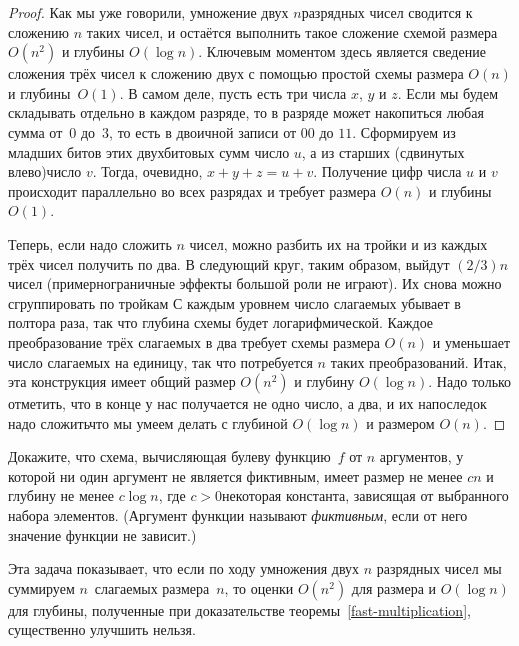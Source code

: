\begin{proof}
Как мы уже говорили, умножение двух $n$\д разрядных чисел
сводится к сложению $n$ таких чисел, и остаётся выполнить такое
сложение схемой размера $O(n^2)$ и глубины $O(\log n)$. Ключевым
моментом здесь является сведение сложения трёх чисел к сложению
двух с помощью простой схемы размера $O(n)$ и глубины~$O(1)$. В
самом деле, пусть есть три числа $x$, $y$ и $z$. Если мы будем
складывать отдельно в каждом разряде, то в разряде может
накопиться любая сумма от~$0$ до~$3$, то есть в двоичной записи
от $00$ до $11$. Сформируем из младших битов этих двухбитовых
сумм число $u$, а из старших (сдвинутых влево)\т число
$v$. Тогда, очевидно, $x+y+z=u+v$. Получение цифр числа $u$ и
$v$ происходит параллельно во всех разрядах и требует размера
$O(n)$ и глубины~$O(1)$.

Теперь, если надо сложить $n$ чисел, можно разбить их на тройки
и из каждых трёх чисел получить по два. В следующий круг, таким
образом, выйдут $(2/3)n$ чисел (примерно\т граничные эффекты
большой роли не играют). Их снова можно сгруппировать по тройкам
 С каждым уровнем число слагаемых убывает в полтора раза,
так что глубина схемы будет логарифмической. Каждое
преобразование трёх слагаемых в два требует схемы размера $O(n)$
и уменьшает число слагаемых на единицу, так что потребуется $n$
таких преобразований. Итак, эта конструкция имеет общий размер
$O(n^2)$ и глубину $O(\log n)$. Надо только отметить, что в
конце у нас получается не одно число, а два, и их напоследок
надо сложить\т что мы умеем делать с глубиной $O(\log n)$ и
размером $O(n)$.
\end{proof}

\begin{problem}
Докажите, что схема, вычисляющая булеву функцию~$f$ от $n$
аргументов, у которой ни один аргумент не является фиктивным,
имеет размер не менее $cn$ и глубину не менее $c\log n$, где
$c>0$\т некоторая константа, зависящая от выбранного набора
элементов. (Аргумент функции называют \emph{фиктивным},%
%
если от
него значение функции не зависит.)
\end{problem}

Эта задача показывает, что если по ходу умножения двух $n$\д
разрядных чисел мы суммируем $n$~слагаемых размера~$n$, то
оценки $O(n^2)$ для размера и $O(\log n)$ для глубины,
полученные при доказательстве теоремы~\ref{fast-multiplication},
существенно улучшить нельзя.

